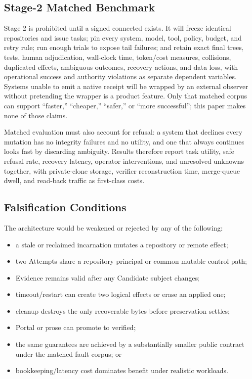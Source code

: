\documentclass[journal]{IEEEtran}
\newcommand{\code}[1]{\texttt{\detokenize{#1}}}
\begin{document}
\subsection{Stage-2 Matched Benchmark}

Stage 2 is prohibited until a signed connected \code{TRANSACTION_PROOF}
exists. It will freeze identical repositories and issue tasks; pin every
system, model, tool, policy, budget, and retry rule; run enough trials to
expose tail failures; and retain exact final trees, tests, human adjudication,
wall-clock time, token/cost measures, collisions, duplicated effects,
ambiguous outcomes, recovery actions, and data loss, with operational success
and authority violations as separate dependent variables. Systems unable to
emit a native receipt will be wrapped by an external observer without
pretending the wrapper is a product feature. Only that matched corpus can
support ``faster,'' ``cheaper,'' ``safer,'' or ``more successful''; this
paper makes none of those claims.

Matched evaluation must also account for refusal: a system that declines every
mutation has no integrity failures and no utility, and one that always
continues looks fast by discarding ambiguity. Results therefore report task
utility, safe refusal rate, recovery latency, operator interventions, and
unresolved unknowns together, with private-clone storage, verifier
reconstruction time, merge-queue dwell, and read-back traffic as first-class
costs.

\subsection{Falsification Conditions}

The architecture would be weakened or rejected by any of the following:

{\small
\begin{itemize}
\item a stale or reclaimed incarnation mutates a repository or remote effect;
\item two Attempts share a repository principal or common mutable control path;
\item Evidence remains valid after any Candidate subject changes;
\item timeout/restart can create two logical effects or erase an applied one;
\item cleanup destroys the only recoverable bytes before preservation settles;
\item Portal or prose can promote \code{UNKNOWN} to verified;
\item the same guarantees are achieved by a substantially smaller public
contract under the matched fault corpus; or
\item bookkeeping/latency cost dominates benefit under realistic workloads.
\end{itemize}
}
\end{document}
